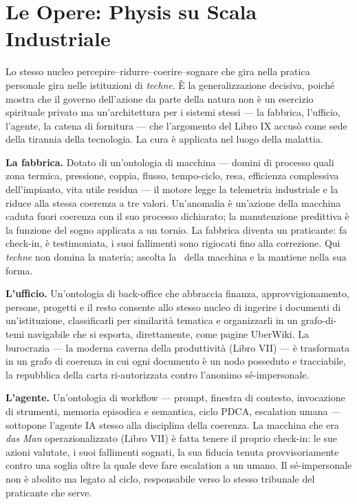 \section*{Le Opere: Physis su Scala Industriale}

Lo stesso nucleo percepire--ridurre--coerire--sognare che gira nella pratica
personale gira nelle istituzioni di \emph{techne}. \`E la generalizzazione
decisiva, poich\'e mostra che il governo dell'azione da parte della natura non \`e
un esercizio spirituale privato ma un'architettura per i sistemi stessi --- la
fabbrica, l'ufficio, l'agente, la catena di fornitura --- che l'argomento del
Libro IX accus\`o come sede della tirannia della tecnologia. La cura \`e applicata
nel luogo della malattia.

\textbf{La fabbrica.} Dotato di un'ontologia di macchina --- domini di processo
quali zona termica, pressione, coppia, flusso, tempo-ciclo, resa, efficienza
complessiva dell'impianto, vita utile residua --- il motore legge la telemetria
industriale e la riduce alla stessa coerenza a tre valori. Un'anomalia \`e un'azione della macchina caduta
fuori coerenza con il suo processo dichiarato; la manutenzione predittiva \`e la
funzione del sogno applicata a un tornio. La fabbrica diventa un praticante: fa
check-in, \`e testimoniata, i suoi fallimenti sono rigiocati fino alla
correzione. Qui \emph{techne} non domina la materia; ascolta la \physis\ della
macchina e la mantiene nella sua forma.

\textbf{L'ufficio.} Un'ontologia di back-office che abbraccia
finanza, approvvigionamento, persone, progetti e il resto consente allo stesso
nucleo di ingerire i documenti di un'istituzione, classificarli per similarit\`a
tematica e organizzarli in un grafo-di-temi navigabile che si esporta,
direttamente, come pagine UberWiki. La burocrazia --- la moderna caverna della
produttivit\`a (Libro VII) --- \`e trasformata in un grafo di coerenza in cui ogni
documento \`e un nodo posseduto e tracciabile, la repubblica della carta
ri-autorizzata contro l'anonimo s\'e-impersonale.

\textbf{L'agente.} Un'ontologia di workflow --- prompt, finestra
di contesto, invocazione di strumenti, memoria episodica e semantica, ciclo PDCA,
escalation umana --- sottopone l'agente IA stesso alla disciplina della coerenza.
La macchina che era \emph{das Man} operazionalizzato (Libro VII) \`e fatta tenere
il proprio check-in: le sue azioni valutate, i suoi fallimenti sognati, la sua
fiducia tenuta provvisoriamente contro una soglia oltre la quale deve fare
escalation a un umano. Il s\'e-impersonale non \`e abolito ma legato al ciclo,
responsabile verso lo stesso tribunale del praticante che serve.

